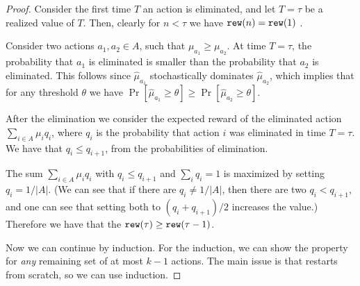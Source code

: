 \begin{proof}
Consider the first time $T$ an action is eliminated, and let
$T=\tau$ be a realized value of $T$. Then, clearly for $n<\tau$ we
have $\mathtt{rew}(n)=\mathtt{rew}(1)$ .

Consider two actions $a_1,a_2\in A$, such that $\mu_{a_1} \geq
\mu_{a_2}$. At time $T=\tau$, the probability that  $a_1$ is
eliminated is smaller than the probability that $a_2$ is eliminated.
This follows since $\hat{\mu}_{a_1}$ stochastically dominates
$\hat{\mu}_{a_2}$, which implies that for any threshold $\theta$ we
have $\Pr[\hat{\mu}_{a_1}\geq\theta]\geq
\Pr[\hat{\mu}_{a_2}\geq\theta]$.

After the elimination we consider the expected reward of the
eliminated action $\sum_{i\in A} \mu_i q_i$, where $q_i$ is the
probability that action $i$ was eliminated in time $T=\tau$. We have
that $q_i \leq q_{i+1}$, from the probabilities of elimination.

The sum $\sum_{i\in A} \mu_i q_i$ with $q_i \leq q_{i+1}$ and
$\sum_i q_i=1$ is maximized by setting $q_i=1/|A|$. (We can see that
if there are $q_i\neq 1/|A|$, then there are two $q_{i}< q_{i+1}$,
and one can see that setting both to $(q_{i}+ q_{i+1})/2$ increases
the value.) Therefore we have that the $\mathtt{rew}(\tau)\geq\mathtt{rew}(\tau-1)$.

Now we can continue by induction. For the induction, we can show the
property for {\em any} remaining set of at most $k-1$ actions. The
main issue is that \SuccesiveEliminationReset restarts from scratch,
so we can use induction.
\end{proof}
